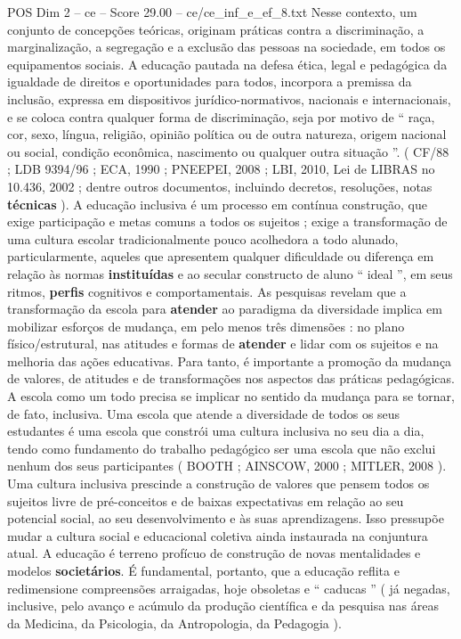 \begin{textsample}{POS Dim 2 – ce – Score 29.00 – ce/ce\_inf\_e\_ef\_8.txt}
Nesse contexto, um conjunto de concepções teóricas, originam práticas contra a discriminação, a marginalização, a segregação e a exclusão das pessoas na sociedade, em todos os equipamentos sociais.
A educação pautada na defesa ética, legal e pedagógica da igualdade de direitos e oportunidades para todos, incorpora a premissa da inclusão, expressa em dispositivos jurídico-normativos, nacionais e internacionais, e se coloca contra qualquer forma de discriminação, seja por motivo de “ raça, cor, sexo, língua, religião, opinião política ou de outra natureza, origem nacional ou social, condição econômica, nascimento ou qualquer outra situação ”. ( CF/88 ; LDB 9394/96 ; ECA, 1990 ; PNEEPEI, 2008 ; LBI, 2010, Lei de LIBRAS no 10.436, 2002 ; dentre outros documentos, incluindo decretos, resoluções, notas \textbf{técnicas} ).
A educação inclusiva é um processo em contínua construção, que exige participação e metas comuns a todos os sujeitos ; exige a transformação de uma cultura escolar tradicionalmente pouco acolhedora a todo alunado, particularmente, aqueles que apresentem qualquer dificuldade ou diferença em relação às normas \textbf{instituídas} e ao secular constructo de aluno “ ideal ”, em seus ritmos, \textbf{perfis} cognitivos e comportamentais.
As pesquisas revelam que a transformação da escola para \textbf{atender} ao paradigma da diversidade implica em mobilizar esforços de mudança, em pelo menos três dimensões : no plano físico/estrutural, nas atitudes e formas de \textbf{atender} e lidar com os sujeitos e na melhoria das ações educativas.
Para tanto, é importante a promoção da mudança de valores, de atitudes e de transformações nos aspectos das práticas pedagógicas.
A escola como um todo precisa se implicar no sentido da mudança para se tornar, de fato, inclusiva.
Uma escola que atende a diversidade de todos os seus estudantes é uma escola que constrói uma cultura inclusiva no seu dia a dia, tendo como fundamento do trabalho pedagógico ser uma escola que não exclui nenhum dos seus participantes ( BOOTH ; AINSCOW, 2000 ; MITLER, 2008 ).
Uma cultura inclusiva prescinde a construção de valores que pensem todos os sujeitos livre de pré-conceitos e de baixas expectativas em relação ao seu potencial social, ao seu desenvolvimento e às suas aprendizagens.
Isso pressupõe mudar a cultura social e educacional coletiva ainda instaurada na conjuntura atual.
A educação é terreno profícuo de construção de novas mentalidades e modelos \textbf{societários}.
É fundamental, portanto, que a educação reflita e redimensione compreensões arraigadas, hoje obsoletas e “ caducas ” ( já negadas, inclusive, pelo avanço e acúmulo da produção científica e da pesquisa nas áreas da Medicina, da Psicologia, da Antropologia, da Pedagogia ).

\end{textsample}
